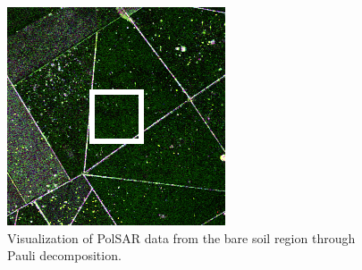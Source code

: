 \documentclass[conference]{IEEEtran}
\begin{document}
\begin{figure}[hbt]
    \vspace{.1\linewidth}
    \centering
    \includegraphics[width = .7\linewidth]{bare_soil.png}
    \caption{Visualization of PolSAR data from the bare soil region through Pauli decomposition.}
    \label{fig:bare_soil}
\end{figure}
\end{document}
